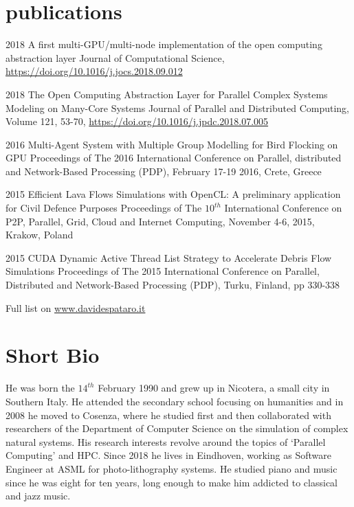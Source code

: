 \documentclass[]{twentysecondcv}
\begin{document}
\section{publications}
\begin{twenty}
    \twentyitem
    {2018}
    {A first multi-GPU/multi-node implementation of the open computing abstraction layer}
    {}
    {\footnotesize{Journal of Computational Science, \url{https://doi.org/10.1016/j.jocs.2018.09.012}}}

    \twentyitem
    {2018}
    {The Open Computing Abstraction Layer for Parallel Complex Systems Modeling on Many-Core Systems}
    {}
    {\footnotesize{Journal of Parallel and Distributed Computing, Volume 121, 53-70, \url{https://doi.org/10.1016/j.jpdc.2018.07.005}}} 
    
    \twentyitem
    {2016}
    {Multi-Agent System with Multiple Group Modelling for Bird Flocking on GPU}
    {}
    {\footnotesize{Proceedings of The 2016 International Conference on Parallel, distributed and Network-Based Processing (PDP), February 17-19 2016, Crete, Greece}}
    
    
    \twentyitem
    {2015}
    {Efficient Lava Flows Simulations with OpenCL: A preliminary application for Civil Defence Purposes}
    {}
    {\footnotesize{Proceedings of The $10^{th}$ International Conference on P2P, Parallel, Grid, Cloud and Internet Computing, November 4-6, 2015, Krakow, Poland}}
     
    \twentyitem 
    {2015}
    {CUDA Dynamic Active Thread List Strategy to Accelerate Debris Flow Simulations}
    {}
    {\footnotesize{Proceedings of The 2015 International Conference on Parallel, Distributed and Network-Based Processing (PDP), Turku, Finland, pp 330-338}}

\end{twenty}
Full list on \url{www.davidespataro.it}



\section{Short Bio}
He was born the $14^{th}$ February 1990 and grew up in Nicotera, a small city in Southern Italy. He attended the secondary school focusing on humanities and in 2008 he moved to Cosenza, where he studied first and then collaborated with researchers of the Department of Computer Science on the simulation of complex natural systems. His research interests revolve around the topics of `Parallel Computing' and  HPC. Since 2018 he lives in Eindhoven, working as Software Engineer at ASML for photo-lithography systems. He studied piano and music since he was eight for ten years, long enough to make him addicted to classical and jazz music. 

\end{document}
